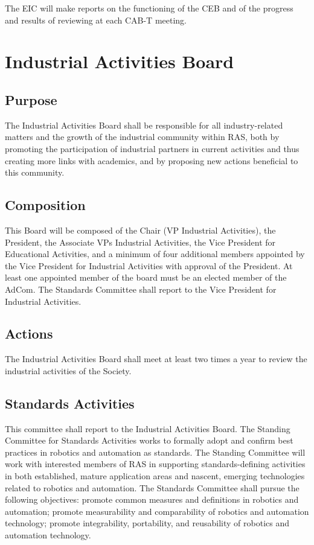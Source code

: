 \documentclass[10pt]{article}
\begin{document}
The EIC will make reports on the functioning of the CEB and of the progress and results of reviewing at each CAB-T meeting.


\section{Industrial Activities Board}
\label{IAB}
\subsection{Purpose}

The Industrial Activities Board shall be responsible for all industry-related matters and the growth of the industrial community within RAS, both by promoting the participation of industrial partners in current activities and thus creating more links with academics, and by proposing new actions beneficial to this community.

\subsection{Composition}
This Board will be composed of the Chair (VP Industrial Activities), the President, the Associate VPs Industrial Activities, the Vice President for Educational Activities, and a minimum of four additional members appointed by the Vice President for Industrial Activities with approval of the President. At least one appointed member of the board must be an elected member of the AdCom. The Standards Committee shall report to the Vice President for Industrial Activities.

\subsection{Actions}
The Industrial Activities Board shall meet at least two times a year to review the industrial activities of the Society.

\subsection{Standards Activities}
This committee shall report to the Industrial Activities Board. The Standing Committee for Standards Activities works to formally adopt and confirm best practices in robotics and automation as standards. The Standing Committee will work with interested members of RAS in supporting standards-defining activities in both established, mature application areas and nascent, emerging technologies related to robotics and automation. The Standards Committee shall pursue the following objectives: promote common measures and definitions in robotics and automation; promote measurability and comparability of robotics and automation technology; promote integrability, portability, and reusability of robotics and automation technology.
\end{document}

